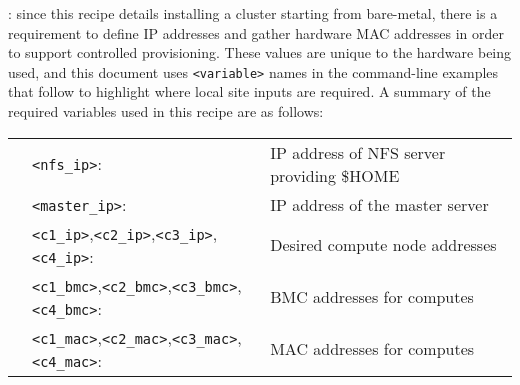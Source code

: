 : since this recipe details installing a cluster
starting from bare-metal, there is a requirement to define IP addresses and gather
hardware MAC addresses in order to support controlled provisioning. These values
are unique to the hardware being used, and this document uses \texttt{<variable>}
names in the command-line examples that follow to highlight where local site
inputs are required. A summary of the required variables used in this recipe
are as follows:

\vspace*{0.2cm}
\begin{tabular}{@{}>{\textbullet}cll@{}}
& \texttt{<nfs\_ip>}:    & IP address of NFS server providing \$HOME \\
& \texttt{<master\_ip>}: & IP address of the master server \\
& \texttt{<c1\_ip>},\texttt{<c2\_ip>},\texttt{<c3\_ip>},\texttt{<c4\_ip>}:
& Desired compute node addresses \\
& \texttt{<c1\_bmc>},\texttt{<c2\_bmc>},\texttt{<c3\_bmc>},\texttt{<c4\_bmc>}:
& BMC addresses for computes \\
& \texttt{<c1\_mac>},\texttt{<c2\_mac>},\texttt{<c3\_mac>},\texttt{<c4\_mac>}:
& MAC addresses for computes \\
\end{tabular}
